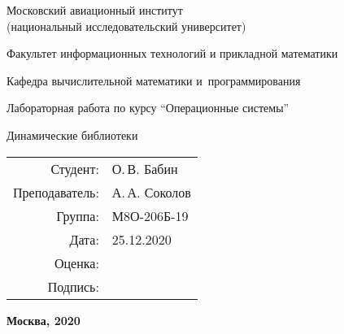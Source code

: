 \begin{titlepage}
\begin{center}
\bfseries

{\Large Московский авиационный институт\\ (национальный исследовательский университет)}

\vspace{48pt}

{\large Факультет информационных технологий и прикладной математики
}

{\large Кафедра вычислительной математики и~программирования}


\vspace{48pt}

Лабораторная работа  по курсу \enquote{Операционные системы}

\vspace{24pt}

{\Large Динамические библиотеки}

\end{center}

\vspace{72pt}

\begin{flushright}
\begin{tabular}{rl}
Студент: & О.\,В. Бабин \\
Преподаватель: & А.\,А. Соколов  \\
Группа: & М8О-206Б-19 \\
Дата: & 25.12.2020 \\
Оценка: & \\
Подпись: & \\
\end{tabular}
\end{flushright}

\vfill

\begin{center}
\bfseries
Москва, 2020
\end{center}
\end{titlepage}

\pagebreak
